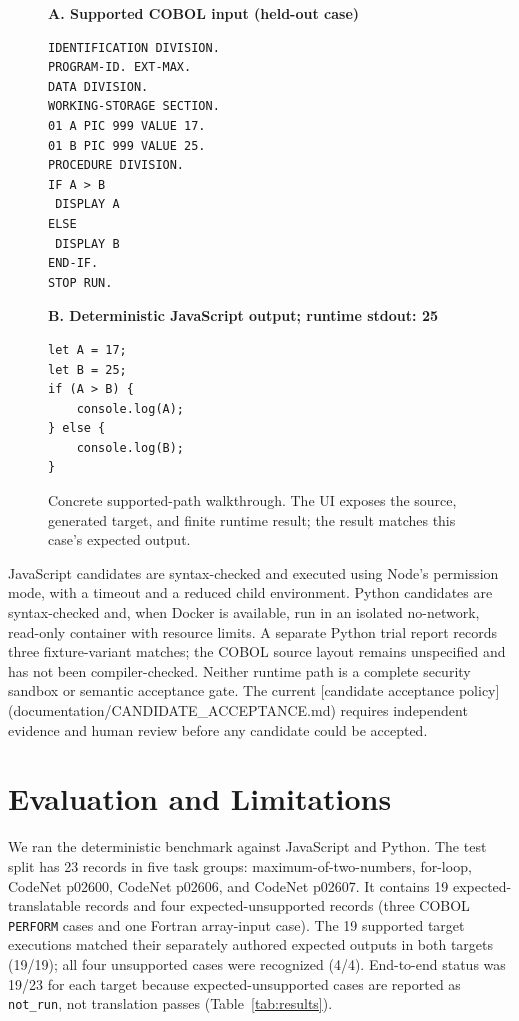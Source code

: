 \documentclass[10pt,conference]{IEEEtran}
\begin{document}
\begin{figure}[t]
\centering
\begin{minipage}[t]{0.48\textwidth}
\textbf{A. Supported COBOL input (held-out case)}
\begin{lstlisting}
IDENTIFICATION DIVISION.
PROGRAM-ID. EXT-MAX.
DATA DIVISION.
WORKING-STORAGE SECTION.
01 A PIC 999 VALUE 17.
01 B PIC 999 VALUE 25.
PROCEDURE DIVISION.
IF A > B
 DISPLAY A
ELSE
 DISPLAY B
END-IF.
STOP RUN.
\end{lstlisting}
\end{minipage}\hfill
\begin{minipage}[t]{0.48\textwidth}
\textbf{B. Deterministic JavaScript output; runtime stdout: 25}
\begin{lstlisting}
let A = 17;
let B = 25;
if (A > B) {
    console.log(A);
} else {
    console.log(B);
}
\end{lstlisting}
\end{minipage}
\caption{Concrete supported-path walkthrough. The UI exposes the source, generated target, and finite runtime result; the result matches this case's expected output.}
\label{fig:walkthrough}
\end{figure}

JavaScript candidates are syntax-checked and executed using Node's permission mode,
with a timeout and a reduced child environment. Python candidates are syntax-checked
and, when Docker is available, run in an isolated no-network, read-only container with
resource limits. A separate Python trial report records three fixture-variant matches;
the COBOL source layout remains unspecified and has not been compiler-checked. Neither
runtime path is a complete security sandbox or semantic acceptance gate. The current
[candidate acceptance policy](documentation/CANDIDATE_ACCEPTANCE.md) requires independent evidence
and human review before any candidate could be accepted.

\section{Evaluation and Limitations}
We ran the deterministic benchmark against JavaScript and Python. The test split has
23 records in five task groups: maximum-of-two-numbers, for-loop, CodeNet p02600,
CodeNet p02606, and CodeNet p02607. It contains 19 expected-translatable records and four expected-unsupported records
(three COBOL \texttt{PERFORM} cases and one Fortran array-input case). The 19 supported
target executions matched their separately authored expected outputs in both targets
(19/19); all four unsupported cases were recognized (4/4). End-to-end status was 19/23
for each target because expected-unsupported
cases are reported as \texttt{not\_run}, not translation passes (Table~\ref{tab:results}).
\end{document}
